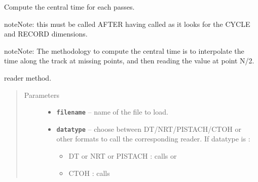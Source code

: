 \documentclass[letterpaper,10pt,english]{sphinxmanual}
\begin{document}
\begin{fulllineitems}
\begin{fulllineitems}
\end{fulllineitems}


\begin{fulllineitems}
\label{altimetry.data:altimetry.data.alti_data.pass_time}
Compute the central time for each passes.

\begin{notice}{note}{Note:}
this must be called AFTER having called {\hyperref[altimetry.data:altimetry.data.alti_data.reorder]{\emph{}}} as it looks for the CYCLE and RECORD dimensions.
\end{notice}

\begin{notice}{note}{Note:}
The methodology to compute the central time is to interpolate the time along the track at missing points, and then reading the value at point N/2.
\end{notice}

\end{fulllineitems}


\begin{fulllineitems}
\label{altimetry.data:altimetry.data.alti_data.read}
reader method.
\begin{quote}\begin{description}
\item[{Parameters}] \leavevmode\begin{itemize}
\item {} 
\textbf{\texttt{filename}} -- name of the file to load.

\item {} 
\textbf{\texttt{datatype}} -- 
choose between DT/NRT/PISTACH/CTOH or other formats to call the corresponding reader. If datatype is :
\begin{itemize}
\item {} 
DT or NRT or PISTACH : calls {\hyperref[altimetry.data:altimetry.data.alti_data.read_sla]{\emph{}}} or {\hyperref[altimetry.data:altimetry.data.alti_data.read_slaext]{\emph{}}}

\item {} 
CTOH : calls {\hyperref[altimetry.data:altimetry.data.alti_data.read_CTOH]{\emph{}}}


\end{itemize}
\end{itemize}
\end{description}
\end{quote}
\end{fulllineitems}
\end{fulllineitems}
\end{document}
